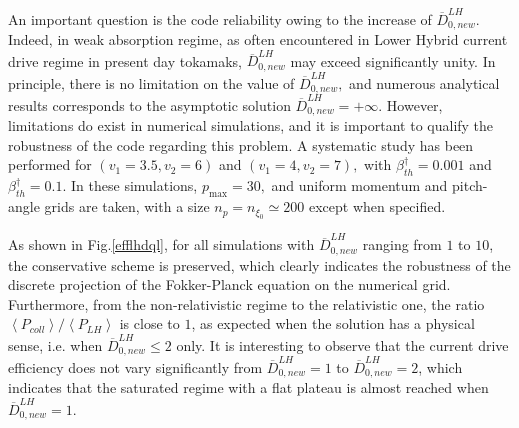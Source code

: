 An important question is the code reliability owing to the increase of $%
\overline{D}_{0,new}^{LH}.$ Indeed, in weak absorption regime, as often
encountered in Lower Hybrid current drive regime in present day tokamaks, $%
\overline{D}_{0,new}^{LH}$ may exceed significantly unity. In principle,
there is no limitation on the value of $\overline{D}_{0,new}^{LH},$ and
numerous analytical results corresponds to the asymptotic solution $%
\overline{D}_{0,new}^{LH}=+\infty .$ However, limitations do exist in
numerical simulations, and it is important to qualify the robustness of the
code regarding this problem. A systematic study has been performed for $
\left( v_{1}=3.5,v_{2}=6\right) $ and $\left( v_{1}=4,v_{2}=7\right) ,$ with
$\beta _{th}^{\dag }=0.001$ and $\beta _{th}^{\dag }=0.1$. In these
simulations, $p_{\max }=30,$ and uniform momentum and pitch-angle grids are
taken, with a size $n_{p}=n_{\xi _{0}}\simeq 200$ except when specified.

As shown in Fig.\ref{efflhdql}, for all simulations with $\overline{D}%
_{0,new}^{LH}$ ranging from $1$ to $10$, the conservative scheme is
preserved, which clearly indicates the robustness of the discrete projection
of the Fokker-Planck equation on the numerical grid. Furthermore, from the
non-relativistic regime to the relativistic one, the ratio $\left\langle
P_{coll}\right\rangle /\left\langle P_{LH}\right\rangle $ is close to $1$,
as expected when the solution has a physical sense, i.e. when $\overline{D}%
_{0,new}^{LH}\leq 2$ only. It is interesting to observe that the current
drive efficiency does not vary significantly from $\overline{D}%
_{0,new}^{LH}=1$ to $\overline{D}_{0,new}^{LH}=2$, which indicates that the
saturated regime with a flat plateau is almost reached when $\overline{D}%
_{0,new}^{LH}=1.$



